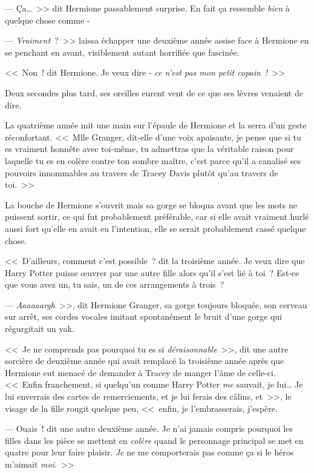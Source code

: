 --- Ça…~>> dit Hermione passablement surprise. En fait ça ressemble \emph{bien} à quelque chose comme -

--- \emph{Vraiment}~?~>> laissa échapper une deuxième année assise face à Hermione en se penchant en avant, visiblement autant horrifiée que fascinée.

<<~Non~! dit Hermione. Je veux dire - \emph{ce n'est pas mon petit copain~!}~>>

Deux secondes plus tard, ses oreilles eurent vent de ce que ses lèvres venaient de dire.

La quatrième année mit une main sur l'épaule de Hermione et la serra d'un geste réconfortant. <<~Mlle Granger, dit-elle d'une voix apaisante, je pense que si tu es vraiment honnête avec toi-même, tu admettras que la véritable raison pour laquelle tu es en colère contre ton sombre maître, c'est parce qu'il a canalisé ses pouvoirs innommables au travers de Tracey Davis plutôt qu'au travers de toi.~>>

La bouche de Hermione s'ouvrit mais sa gorge se bloqua avant que les mots ne puissent sortir, ce qui fut probablement préférable, car si elle avait vraiment hurlé aussi fort qu'elle en avait eu l'intention, elle se serait probablement cassé quelque chose.

<<~D'ailleurs, comment c'est possible~? dit la troisième année. Je veux dire que Harry Potter puisse œuvrer par une autre fille alors qu'il s'est lié à toi~? Est-ce que vous avez un, tu sais, un de ces arrangements à trois~?

--- \emph{Aaaaaargh}~>>, dit Hermione Granger, sa gorge toujours bloquée, son cerveau sur arrêt, ses cordes vocales imitant spontanément le bruit d'une gorge qui régurgitait un yak.


<<~Je ne comprends pas pourquoi tu es si \emph{déraisonnable}~>>, dit une autre sorcière de deuxième année qui avait remplacé la troisième année après que Hermione eut menacé de demander à Tracey de manger l'âme de celle-ci. <<~Enfin franchement, si quelqu'un comme Harry Potter \emph{me} sauvait, je lui… Je lui enverrais des cartes de remerciements, et je lui ferais des câlins, et~>>, le visage de la fille rougit quelque peu, <<~enfin, je l'embrasserais, j'espère.

--- Ouais~! dit une autre deuxième année. Je n'ai jamais compris pourquoi les filles dans les pièce se mettent en \emph{colère} quand le personnage principal se met en quatre pour leur faire plaisir. \emph{Je} ne me comporterais pas comme ça si le héros m'aimait \emph{moi}.~>>

